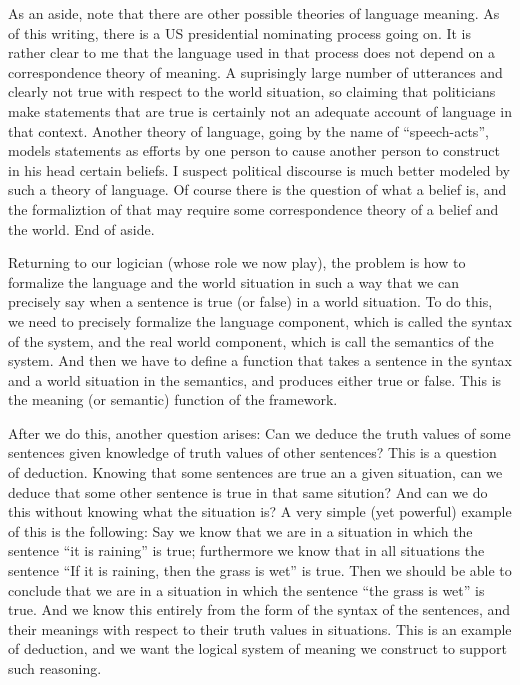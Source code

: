 As an aside, note that there are other possible theories of language
meaning.  As of this writing, there is a US presidential nominating
process going on.  It is rather clear to me that the language used in
that process does not depend on a correspondence theory of meaning.  A
suprisingly large number of utterances and clearly not true with
respect to the world situation, so claiming that politicians make
statements that are true is certainly not an adequate account of
language in that context.  Another theory of language, going by the
name of ``speech-acts'', models statements as efforts by one person to
cause another person to construct in his head certain beliefs.  I
suspect political discourse is much better modeled by such a theory of
language.  Of course there is the question of what a belief is, and
the formaliztion of that may require some correspondence theory of a
belief and the world.  End of aside.

Returning to our logician (whose role we now play), the problem is how
to formalize the language and the world situation in such a way that
we can precisely say when a sentence is true (or false) in a world
situation.  To do this, we need to precisely formalize the language
component, which is called the syntax of the system, and the real
world component, which is call the semantics of the system.  And then
we have to define a function that takes a sentence in the syntax and
a world situation in the semantics, and produces either true or false.
This is the meaning (or semantic) function of the framework.

After we do this, another question arises: Can we deduce the truth
values of some sentences given knowledge of truth values of other
sentences?  This is a question of deduction.  Knowing that some
sentences are true an a given situation, can we deduce that some other
sentence is true in that same sitution?  And can we do this without
knowing what the situation is?  A very simple (yet powerful) example
of this is the following:  Say we know that we are in a situation in
which the sentence ``it is raining'' is true; furthermore we know that
in all situations the sentence ``If it is raining, then the grass is
wet'' is true.  Then we should be able to conclude that we are in a
situation in which the sentence ``the grass is wet'' is true.  And we
know this entirely from the form of the syntax of the sentences, and
their meanings with respect to their truth values in situations.  This
is an example of deduction, and we want the logical system of meaning
we construct to support such reasoning.

